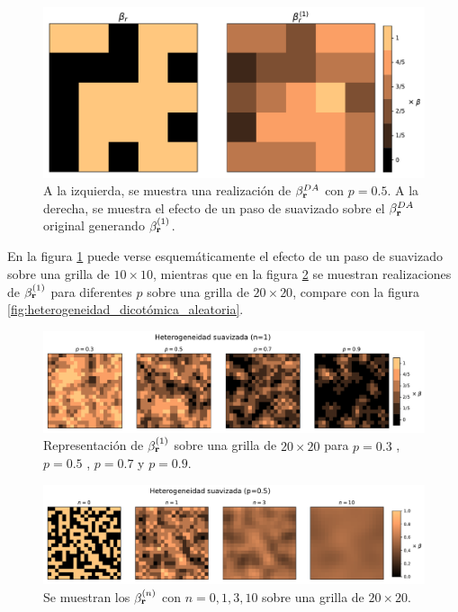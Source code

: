 \begin{figure}[t]
  \centering
  \includegraphics[width=.6\textwidth]{smoth_step.pdf}
  \caption[Paso de suavizado de la hetereogeneidad suavizada]{A la izquierda, se muestra una realización de $\beta_{\vb r}^{DA}$ con $p=0.5$. A la derecha, se muestra el efecto de un paso de suavizado 
  sobre el $\beta_{\vb r}^{DA}$ original generando $\beta_{\vb r}^{(1)}$.}
  \label{fig:smoth_step}
\end{figure}

En la figura \ref{fig:smoth_step} puede verse esquemáticamente el efecto de un paso de suavizado sobre una grilla de $10\times10$, mientras que 
en la figura \ref{fig:smoth} se muestran realizaciones de $\beta^{(1)}_{\vb r}$ para diferentes $p$ sobre una grilla de $20\times20$, compare con 
la figura \ref{fig:heterogeneidad_dicotómica_aleatoria}.

\begin{figure}[!b]
  \centering
  \includegraphics[width=.9\textwidth]{het_suav.pdf}
  \caption[Representación del medio S sobre una grilla de $20 \times 20$ con $n=1$.]{Representación de $\beta^{(1)}_{\vb r}$ sobre una grilla de $20 \times 20$ para  $p=0.3$ , $p=0.5$ , $p=0.7$ y $p=0.9$.}
  \label{fig:smoth}
\end{figure}
\begin{figure}[!b]
  \centering
  \includegraphics[width=.9\textwidth]{nsmoth_step.pdf}
  \caption[Representación del medio S sobre una grilla de $20 \times 20$ con distintos $n$.]{Se muestran los $\beta^{(n)}_{\vb r}$ con $n=0,1,3,10$ sobre una grilla de $20\times20$.}
  \label{fig:nsmoth_step}
\end{figure}

